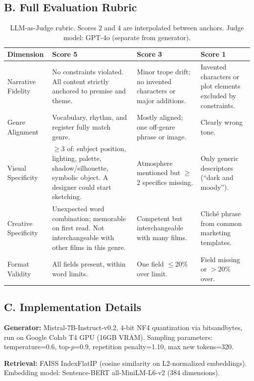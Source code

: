 \documentclass[10pt,twocolumn]{article}
\begin{document}
\subsection*{B. Full Evaluation Rubric}

\begin{table}[h]
\centering
\small
\caption*{LLM-as-Judge rubric. Scores 2 and 4 are interpolated between anchors. Judge model: GPT-4o (separate from generator).}
\begin{tabularx}{\textwidth}{p{2.3cm}XXX}
\toprule
\textbf{Dimension} & \textbf{Score 5} & \textbf{Score 3} & \textbf{Score 1} \\
\midrule
Narrative Fidelity & No constraints violated. All content strictly anchored to premise and theme. & Minor trope drift; no invented characters or major additions. & Invented characters or plot elements excluded by constraints. \\
\midrule
Genre Alignment & Vocabulary, rhythm, and register fully match genre. & Mostly aligned; one off-genre phrase or image. & Clearly wrong tone. \\
\midrule
Visual Specificity & $\geq$3 of: subject position, lighting, palette, shadow/silhouette, symbolic object. A designer could start sketching. & Atmosphere mentioned but $\geq$2 specifics missing. & Only generic descriptors (``dark and moody''). \\
\midrule
Creative Specificity & Unexpected word combination; memorable on first read. Not interchangeable with other films in this genre. & Competent but interchangeable with many films. & Clich\'{e} phrase from common marketing templates. \\
\midrule
Format Validity & All fields present, within word limits. & One field $\leq$20\% over limit. & Field missing or $>$20\% over. \\
\bottomrule
\end{tabularx}
\end{table}

\subsection*{C. Implementation Details}

\textbf{Generator:} Mistral-7B-Instruct-v0.2, 4-bit NF4 quantization via bitsandbytes, run on Google Colab T4 GPU (16GB VRAM). Sampling parameters: temperature=0.6, top-$p$=0.9, repetition penalty=1.10, max new tokens=320.

\textbf{Retrieval:} FAISS IndexFlatIP (cosine similarity on L2-normalized embeddings). Embedding model: Sentence-BERT all-MiniLM-L6-v2 (384 dimensions).
\end{document}
